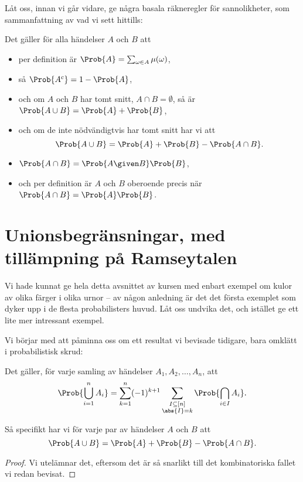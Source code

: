 \documentclass[nobib]{tufte-handout}
\begin{document}
Låt oss, innan vi går vidare, ge några basala räkneregler för sannolikheter, som sammanfattning av vad vi sett hittills:

\begin{lemma}
    Det gäller för alla händelser $A$ och $B$ att
    \begin{itemize}
        \item per definition är $\Prob{A} = \sum_{\omega \in A} \mu(\omega)$,
        \item så $\Prob{A^c} = 1 - \Prob{A}$,
        \item och om $A$ och $B$ har tomt snitt, $A\cap B = \emptyset$, så är $\Prob{A \cup B} = \Prob{A} + \Prob{B}$,
        \item och om de inte nödvändigtvis har tomt snitt har vi att
        $$\Prob{A \cup B} = \Prob{A} + \Prob{B} - \Prob{A \cap B}.$$
        \item $\Prob{A \cap B} = \Prob{A \given B}\Prob{B}$,
        \item och per definition är $A$ och $B$ oberoende precis när $\Prob{A \cap B} = \Prob{A}\Prob{B}$.
    \end{itemize}
\end{lemma}

\section{Unionsbegränsningar, med tillämpning på Ramseytalen}

Vi hade kunnat ge hela detta avsnittet av kursen med enbart exempel om kulor av olika färger i olika urnor -- av någon anledning är det det första exemplet som dyker upp i de flesta probabilisters huvud. Låt oss undvika det, och istället ge ett lite mer intressant exempel.

Vi börjar med att påminna oss om ett resultat vi bevisade tidigare, bara omklätt i probabilistisk skrud:

\begin{lemma}
    Det gäller, för varje samling av händelser $A_1, A_2, \ldots, A_n$, att
    $$\Prob{\bigcup_{i=1}^n A_i} = \sum_{k=1}^{n} (-1)^{k+1}\sum_{\substack{I \subseteq [n]\\\abs{I} = k}} \Prob{\bigcap_{i\in I} A_i}.$$

    Så specifikt har vi för varje par av händelser $A$ och $B$ att
    $$\Prob{A \cup B} = \Prob{A} + \Prob{B} - \Prob{A \cap B}.$$

    \begin{proof}
        Vi utelämnar det, eftersom det är så snarlikt till det kombinatoriska fallet vi redan bevisat.
    \end{proof}
\end{lemma}
\end{document}
